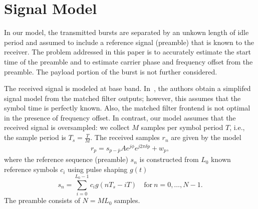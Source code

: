 \section{Signal Model}%
\label{sec:model}


In our model, the transmitted bursts are separated by an unkown length of idle period and assumed to
include a reference signal (preamble) that is known to the receiver.
The problem addressed in this paper is to accurately estimate the
start time of the preamble and to estimate carrier phase and frequency
offset from the preamble. 
The payload portion of the burst is not further considered. 

The received signal is modeled at base band.
In~\cite{Morelli_Mengali_98}, 
the authors obtain a simplifed signal model from the matched filter
outputs;
however, this assumes that the symbol time is perfectly known.
Also, the matched filter frontend is not optimal in the presence of
frequency offset.
In contrast, our model assumes that the received signal is
oversampled: we collect $M$ samples per symbol period $T$, i.e., the
sample period is $T_s=\frac{T}{M}$. 
The received samples $r_n$ are given by the model
\begin{equation}
    \begin{aligned}
      \label{eq:model}
      r_p = s_{p-\bar{p}}Ae^{j\phi}e^{j2\pi\delta p}+w_{p},
    \end{aligned}
  \end{equation}
where the reference sequence (preamble) $s_n$ is constructed from
$L_0$ known reference symbols $c_i$ using pulse shaping $g(t)$
\begin{equation}
  \label{eq:l_ref_sig_discrete}
  s_n=\sum_{i=0}^{L_0-1} c_i g(nT_s-iT) \quad \text{for}~n=0,\ldots,N-1.
\end{equation}
The preamble consists of $N=M L_0$ samples.  
  

